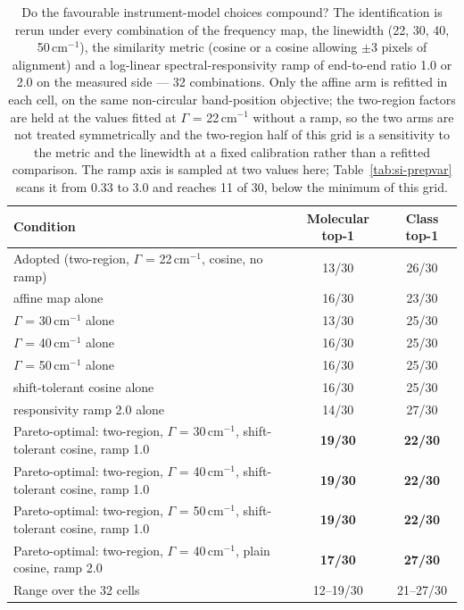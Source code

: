 \documentclass[11pt]{article}
\newcommand*\wn{\ensuremath{\text{cm}^{-1}}}
\begin{document}
\begin{table}[htbp]
\centering
\caption{Do the favourable instrument-model choices compound? The identification is rerun under every combination of the frequency map, the linewidth (22, 30, 40, 50\,\wn{}), the similarity metric (cosine or a cosine allowing $\pm$3 pixels of alignment) and a log-linear spectral-responsivity ramp of end-to-end ratio 1.0 or 2.0 on the measured side --- 32 combinations. Only the affine arm is refitted in each cell, on the same non-circular band-position objective; the two-region factors are held at the values fitted at $\Gamma$ = 22\,\wn{} without a ramp, so the two arms are not treated symmetrically and the two-region half of this grid is a sensitivity to the metric and the linewidth at a fixed calibration rather than a refitted comparison. The ramp axis is sampled at two values here; Table~\ref{tab:si-prepvar} scans it from 0.33 to 3.0 and reaches 11 of 30, below the minimum of this grid.}
\label{tab:si-jointenv}
\small
\begin{tabular}{lcc}
\toprule
Condition & Molecular top-1 & Class top-1 \\
\midrule
Adopted (two-region, $\Gamma$ = 22\,\wn{}, cosine, no ramp) & 13/30 & 26/30 \\
\midrule
affine map alone & 16/30 & 23/30 \\
$\Gamma$ = 30\,\wn{} alone & 13/30 & 25/30 \\
$\Gamma$ = 40\,\wn{} alone & 16/30 & 25/30 \\
$\Gamma$ = 50\,\wn{} alone & 16/30 & 25/30 \\
shift-tolerant cosine alone & 16/30 & 25/30 \\
responsivity ramp 2.0 alone & 14/30 & 27/30 \\
\midrule
Pareto-optimal: two-region, $\Gamma$ = 30\,\wn{}, shift-tolerant cosine, ramp 1.0 & \textbf{19/30} & \textbf{22/30} \\
Pareto-optimal: two-region, $\Gamma$ = 40\,\wn{}, shift-tolerant cosine, ramp 1.0 & \textbf{19/30} & \textbf{22/30} \\
Pareto-optimal: two-region, $\Gamma$ = 50\,\wn{}, shift-tolerant cosine, ramp 1.0 & \textbf{19/30} & \textbf{22/30} \\
Pareto-optimal: two-region, $\Gamma$ = 40\,\wn{}, plain cosine, ramp 2.0 & \textbf{17/30} & \textbf{27/30} \\
\midrule
Range over the 32 cells & 12--19/30 & 21--27/30 \\
\bottomrule
\end{tabular}


\end{table}
\end{document}
